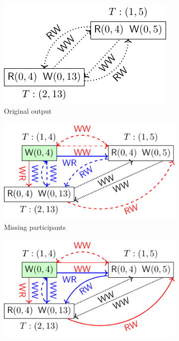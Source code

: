 
\begin{figure}[t]
  \centering
    \begin{subfigure}[b]{0.40\textwidth}
        \centering
        \includegraphics[width = \textwidth]{figs/galera-original}
        \caption{Original output}
    \end{subfigure}\hspace{3ex} \pause
    \begin{subfigure}[b]{0.40\textwidth}
        \centering
        \includegraphics[width = \textwidth]{figs/galera-recovery-1}
        \caption{Missing  participants}
    \end{subfigure}\hspace{3ex} \pause
    \begin{subfigure}[b]{0.40\textwidth}
        \centering
        \includegraphics[width = \textwidth]{figs/galera-recovery-2}

\end{subfigure}
\end{figure}
